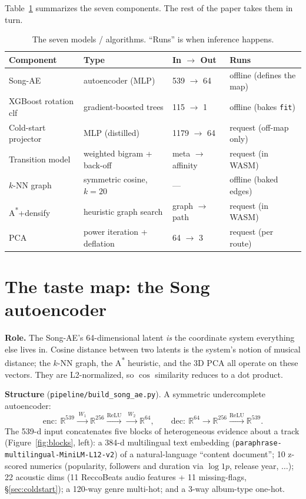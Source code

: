 \documentclass[11pt]{article}
\newcommand{\file}[1]{\texttt{\small #1}}
\newcommand{\code}[1]{\texttt{\small #1}}
\begin{document}
Table~\ref{tab:models} summarizes the seven components. The rest of the paper takes them in turn.

\begin{table}[H]\centering\small
\caption{The seven models / algorithms. ``Runs'' is when inference happens.}
\label{tab:models}
\begin{tabular}{@{}llll@{}}
\toprule
Component & Type & In $\rightarrow$ Out & Runs \\
\midrule
Song-AE & autoencoder (MLP) & 539 $\rightarrow$ 64 & offline (defines the map) \\
XGBoost rotation clf & gradient-boosted trees & 115 $\rightarrow$ 1 & offline (bakes \code{fit}) \\
Cold-start projector & MLP (distilled) & 1179 $\rightarrow$ 64 & request (off-map only) \\
Transition model & weighted bigram + back-off & meta $\rightarrow$ affinity & request (in WASM) \\
$k$-NN graph & symmetric cosine, $k{=}20$ & --- & offline (baked edges) \\
A\textsuperscript{*}{+}densify & heuristic graph search & graph $\rightarrow$ path & request (in WASM) \\
PCA & power iteration {+} deflation & 64 $\rightarrow$ 3 & request (per route) \\
\bottomrule
\end{tabular}
\end{table}

\section{The taste map: the Song autoencoder}
\label{sec:songae}

\textbf{Role.} The Song-AE's 64-dimensional latent \emph{is} the coordinate system everything else
lives in. Cosine distance between two latents is the system's notion of musical distance; the $k$-NN
graph, the A\textsuperscript{*} heuristic, and the 3D PCA all operate on these vectors. They are
L2-normalized, so $\cos$ similarity reduces to a dot product.

\textbf{Structure} (\file{pipeline/build\_song\_ae.py}). A symmetric undercomplete autoencoder:
\[
\text{enc}:\ \mathbb{R}^{539}\xrightarrow{\;W_1\;}\mathbb{R}^{256}\xrightarrow{\text{ReLU}}
\xrightarrow{\;W_2\;}\mathbb{R}^{64},\qquad
\text{dec}:\ \mathbb{R}^{64}\rightarrow\mathbb{R}^{256}\xrightarrow{\text{ReLU}}\mathbb{R}^{539}.
\]
The 539-d input concatenates five blocks of heterogeneous evidence about a track
(Figure~\ref{fig:blocks}, left): a 384-d multilingual text embedding
(\code{paraphrase-multilingual-MiniLM-L12-v2}) of a natural-language ``content document'';
10 z-scored numerics (popularity, followers and duration via $\log 1p$, release year, $\dots$);
22 acoustic dims (11 ReccoBeats audio features {+} 11 missing-flags, \S\ref{sec:coldstart}); a
120-way genre multi-hot; and a 3-way album-type one-hot.
\end{document}
